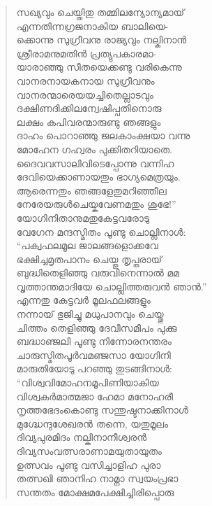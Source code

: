 \begin{verse}
സഖ്യവും ചെയ്തിതു തമ്മിലന്യോന്യമായ്\\
എന്നതിന്നഗ്രജനാകിയ ബാലിയെ-\\
ക്കൊന്നു സുഗ്രീവനു രാജ്യവും നല്കിനാന്‍\\
ശ്രീരാമനുമതിന്‍ പ്രത്യുപകാരമാ-\\
യാരാഞ്ഞു സീതയെക്കണ്ടു വരികെന്നു\\
വാനരനായകനായ സുഗ്രീവനും\\
വാനരന്മാരെയയച്ചിതെല്ലാടവും\\
ദക്ഷിണദിക്കിലന്വേഷിപ്പതിനൊരു\\
ലക്ഷം കപിവരന്മാരുണ്ടു ഞങ്ങളും\\
ദാഹം പൊറാഞ്ഞു ജലകാംക്ഷയാ വന്നു\\
മോഹേന ഗഹ്വരം പുക്കിതറിയാതെ.\\
ദൈവവസാലിവിടെപ്പോന്നു വന്നിഹ\\
ദേവിയെക്കാണായതും ഭാഗ്യമെത്രയും.\\
ആരെന്നതും ഞങ്ങളേതുമറിഞ്ഞീല\\
നേരേയരുള്‍ചെയ്കവേണമതും ശുഭേ!”\\
യോഗിനിതാനുമതുകേട്ടവരോടു\\
വേഗേന മന്ദസ്മിതം പൂണ്ടു ചൊല്ലിനാള്‍:\\
“പക്വഫലമൂല ജാലങ്ങളൊക്കവേ\\
ഭക്ഷിച്ചമൃതപാനം ചെയ്തു തൃപ്തരായ്\\
ബുദ്ധിതെളിഞ്ഞു വരുവിനെന്നാല്‍ മമ\\
വൃത്താന്തമാദിയേ ചൊല്ലിത്തരുവന്‍ ഞാന്‍.”\\
എന്നതു കേട്ടവര്‍ മൂലഫലങ്ങളും\\
നന്നായ് ഭുജിച്ചു മധുപാനവും ചെയ്തു\\
ചിത്തം തെളിഞ്ഞു ദേവീസമീപം പുക്കു\\
ബദ്ധാഞ്ജലി പൂണ്ടു നിന്നോരനന്തരം\\
ചാരുസ്മിതപൂര്‍വമഞ്ജസാ യോഗിനി\\
മാരുതിയോടു പറഞ്ഞു തുടങ്ങിനാള്‍:\\
“വിശ്വവിമോഹനമൂപിണിയാകിയ\\
വിശ്വകര്‍മാത്മജാ ഹേമാ മനോഹരീ\\
നൃത്തഭേദംകൊണ്ടു സന്തുഷ്ടനാക്കിനാള്‍\\
മുഗ്ദ്ധേന്ദുശേഖരന്‍ തന്നെ, യതുമൂലം\\
ദിവ്യപുരമിദം നല്കിനാനീശ്വരന്‍\\
ദിവ്യസംവത്സരാണാമയുതായുതം\\
ഉത്സവം പൂണ്ടു വസിച്ചാളിഹ പുരാ\\
തത്സഖി ഞാനിഹ നാമ്നാ സ്വയംപ്രഭാ\\
സന്തതം മോക്ഷമപേക്ഷിച്ചിരിപ്പൊരു\\

\end{verse}
